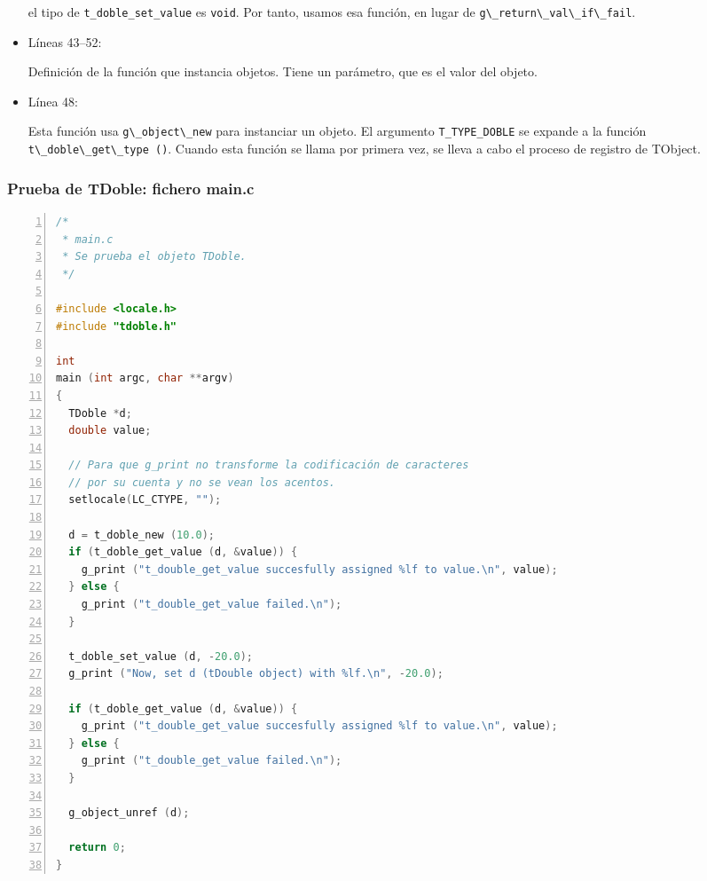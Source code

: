 \begin{itemize}
  el tipo de \texttt{t\_doble\_set\_value} es \texttt{void}. Por tanto, usamos esa función, en lugar de
  \passthrough{\lstinline!g\_return\_val\_if\_fail!}.
\item Líneas 43--52:\par
  Definición de la función que instancia objetos. Tiene un parámetro, que es el valor del objeto.
\item Línea 48:\par
  Esta función usa \passthrough{\lstinline!g\_object\_new!} para instanciar un objeto. El argumento
  \texttt{T\_TYPE\_DOBLE} se expande a la función \passthrough{\lstinline!t\_doble\_get\_type ()!}.
  Cuando esta función se llama por primera vez, se lleva a cabo el proceso de registro de \textsf{TObject}.
\end{itemize}

\subsubsection{Prueba de \textsf{TDoble}: fichero \textsf{main.c}}

\begin{lstlisting}[language=C, numbers=left]
/*
 * main.c
 * Se prueba el objeto TDoble.
 */

#include <locale.h>
#include "tdoble.h"

int
main (int argc, char **argv)
{
  TDoble *d;
  double value;

  // Para que g_print no transforme la codificación de caracteres
  // por su cuenta y no se vean los acentos.
  setlocale(LC_CTYPE, "");

  d = t_doble_new (10.0);
  if (t_doble_get_value (d, &value)) {
    g_print ("t_double_get_value succesfully assigned %lf to value.\n", value);
  } else {
    g_print ("t_double_get_value failed.\n");
  }

  t_doble_set_value (d, -20.0);
  g_print ("Now, set d (tDouble object) with %lf.\n", -20.0);
  
  if (t_doble_get_value (d, &value)) {
    g_print ("t_double_get_value succesfully assigned %lf to value.\n", value);
  } else {
    g_print ("t_double_get_value failed.\n");
  }
  
  g_object_unref (d);

  return 0;
}
\end{lstlisting}

